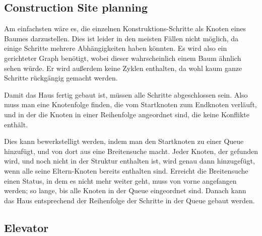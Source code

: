 \documentclass[12pt,a4paper]{article}
\begin{document}
\subsection*{Construction Site planning}
Am einfachsten wäre es, die einzelnen Konstruktions-Schritte als Knoten
eines Baumes darzustellen. Dies ist leider in den meisten Fällen nicht
möglich, da einige Schritte mehrere Abhängigkeiten haben könnten.
Es wird also ein gerichteter Graph benötigt, wobei dieser wahrscheinlich
einem Baum ähnlich sehen würde. Er wird außerdem keine Zyklen enthalten,
da wohl kaum ganze Schritte rückgängig gemacht werden.

Damit das Haus fertig gebaut ist, müssen alle Schritte abgeschlossen
sein. Also muss man eine Knotenfolge finden, die vom Startknoten
zum Endknoten verläuft, und in der die Knoten in einer Reihenfolge angeordnet sind,
die keine Konflikte enthält.

Dies kann bewerkstelligt werden, indem man den Startknoten
zu einer Queue hinzufügt, und von dort aus eine Breitensuche macht.
Jeder Knoten, der gefunden wird, und noch nicht in der Struktur
enthalten ist, wird genau dann hinzugefügt, wenn alle seine Eltern-Knoten
bereits enthalten sind.
Erreicht die Breitensuche einen Status, in dem es nicht mehr weiter geht,
muss von vorne angefangen werden; so lange, bis alle Knoten in der Queue
eingeordnet sind. Danach kann das Haus entsprechend der Reihenfolge der Schritte
in der Queue gebaut werden.

\subsection*{Elevator}
\end{document}
